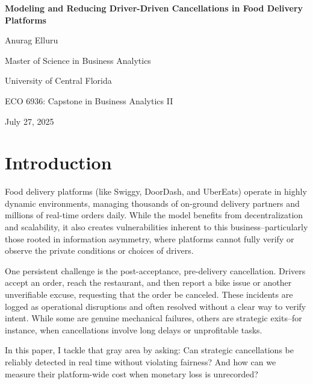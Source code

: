 \documentclass[12pt,letterpaper]{article}
\begin{document}
\begin{titlepage}
    \centering
    \vspace*{2cm}
    {\huge\bfseries Modeling and Reducing Driver-Driven Cancellations in Food Delivery Platforms\par}
    \vspace{2cm}
    {\Large Anurag Elluru\par}
    \vspace{1cm}
    {\large Master of Science in Business Analytics\par}
    {\large University of Central Florida\par}
    \vspace{2cm}
    {\large ECO 6936: Capstone in Business Analytics II\par}
    \vspace{1cm}
    {\large July 27, 2025\par}
\end{titlepage}


\newpage
{}
\setcounter{page}{1}

\section{Introduction}

Food delivery platforms (like Swiggy, DoorDash, and UberEats) operate in highly dynamic environments, managing thousands of on-ground delivery partners and millions of real-time orders daily. While the model benefits from decentralization and scalability, it also creates vulnerabilities inherent to this business--particularly those rooted in information asymmetry, where platforms cannot fully verify or observe the private conditions or choices of drivers.

One persistent challenge is the post-acceptance, pre-delivery cancellation. Drivers accept an order, reach the restaurant, and then report a bike issue or another unverifiable excuse, requesting that the order be canceled. These incidents are logged as operational disruptions and often resolved without a clear way to verify intent. While some are genuine mechanical failures, others are strategic exits--for instance, when cancellations involve long delays or unprofitable tasks.

In this paper, I tackle that gray area by asking: Can strategic cancellations be reliably detected in real time without violating fairness? And how can we measure their platform-wide cost when monetary loss is unrecorded?
\end{document}
